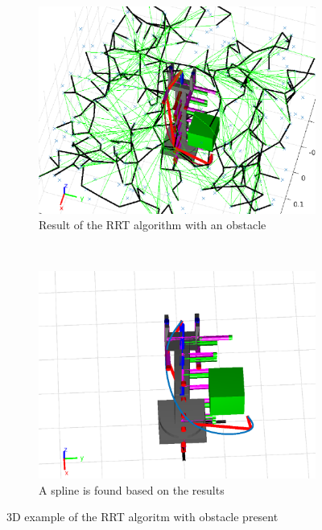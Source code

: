 \def\picsSiz{1.08}
\begin{figure}[htbp]
    \centering
    \begin{subfigure}[htbp]{0.45\textwidth}
        \centering
        \includegraphics[width = \picsSiz\linewidth]{img/rrt3dOBav.eps}
        \caption{Result of the RRT algorithm with an obstacle}
        \label{fig:obav1}
    \end{subfigure}
    ~ 
    \begin{subfigure}[htbp]{0.45\textwidth}
        \centering
        \includegraphics[width = \picsSiz\linewidth]{img/rrt3dOBavPath.eps}
        \caption{A spline is found based on the results}
        \label{fig:obav2}
    \end{subfigure}
    \caption{3D example of the RRT algoritm with obstacle present}
    \label{fig:obav}
\end{figure}
